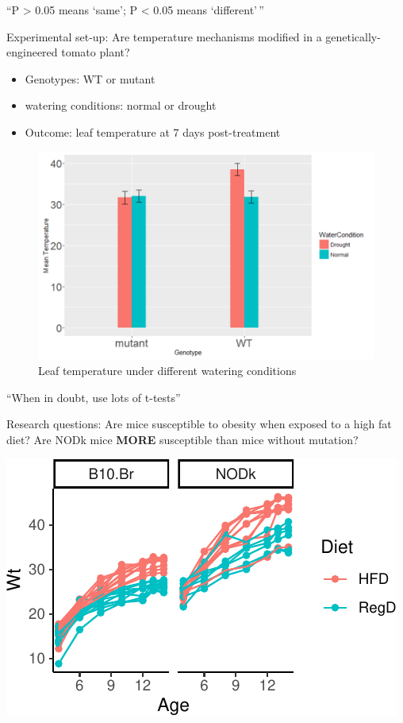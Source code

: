 \documentclass[
  12pt,
  ignorenonframetext,
  aspectratio=169,
]{beamer}
\providecommand{\tightlist}{%
  \setlength{\itemsep}{0pt}\setlength{\parskip}{0pt}}
\begin{document}
\begin{frame}{``P \textgreater{} 0.05 means `same'; P \textless{} 0.05
means `different'\,''}
\protect\hypertarget{p-0.05-means-same-p-0.05-means-different}{}

Experimental set-up: Are temperature mechanisms modified in a
genetically-engineered tomato plant?

\begin{itemize}
\tightlist
\item
  Genotypes: WT or mutant
\item
  watering conditions: normal or drought
\item
  Outcome: leaf temperature at 7 days post-treatment
\end{itemize}

\begin{figure}

\hfill{}\includegraphics[width=0.4\linewidth,height=0.4\textheight]{../images/Lecture1_interaction} 

\caption{Leaf temperature under different watering conditions}\label{fig:unnamed-chunk-5}
\end{figure}

\end{frame}

\begin{frame}{``When in doubt, use lots of t-tests''}
\protect\hypertarget{when-in-doubt-use-lots-of-t-tests}{}

Research questions: Are mice susceptible to obesity when exposed to a
high fat diet? Are NODk mice \textbf{MORE} susceptible than mice without
mutation?

\begin{center}\includegraphics{Lecture-1_files/figure-beamer/unnamed-chunk-6-1} \end{center}

\end{frame}
\end{document}
